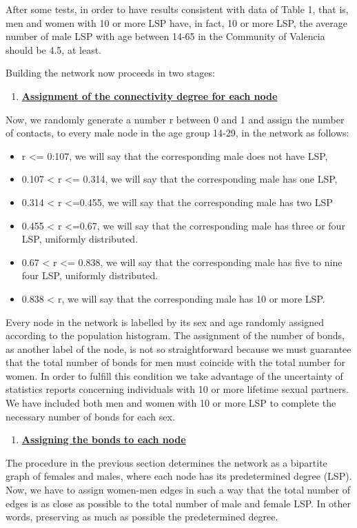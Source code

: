 After some tests, in order to have results consistent with data of Table 1, that is, men and women with 10 or more LSP have, in fact, 10 or more LSP, the average number of male LSP with age between 14-65 in the  Community of Valencia should be 4.5, at least.

Building the network now proceeds in two stages:
\begin{enumerate}
	\item \underline{\textbf{Assignment of the connectivity degree for each node}}
\end{enumerate}
	Now, we randomly generate a number r between 0 and 1 and assign the number of contacts, to every male node in the age group 14-29, in the network as follows:

\begin{itemize}
	\item r  <= 0:107,  we will say that the corresponding male does not have LSP,
	\item 0.107 < r  <= 0.314, we will say that the corresponding male has one LSP,
	\item 0.314 < r <=0.455, we will say that the corresponding male has two LSP
	\item 0.455 < r <=0.67, we will say that the corresponding male has three or four LSP, uniformly distributed.
	\item 0.67 < r <= 0.838, we will say that the corresponding male has five to nine four LSP, uniformly distributed.
	\item 0.838 < r, we will say that the corresponding male has 10 or more LSP.
\end{itemize}

Every node in the network is labelled by its sex and age randomly assigned
according to the population histogram. The assignment of the number of bonds, as another label of the node, is not so straightforward because we must guarantee that the total number of bonds for men must coincide with the total number for women. In order to fulfill this condition we take advantage of the uncertainty of statistics reports concerning individuals with 10 or more lifetime sexual partners. We have included both men and women with 10 or more LSP to complete the necessary number of bonds for each sex.

\begin{enumerate}
	\item \underline{\textbf{Assigning the bonds to each node}}
\end{enumerate}
The procedure in the previous section determines the network as a bipartite graph of females and males, where each node has its predetermined degree (LSP). Now, we have to assign women-men edges in such a way that the total number of edges is as close as possible to the total number of male and female LSP. In other words, preserving as much as possible the predetermined degree.

